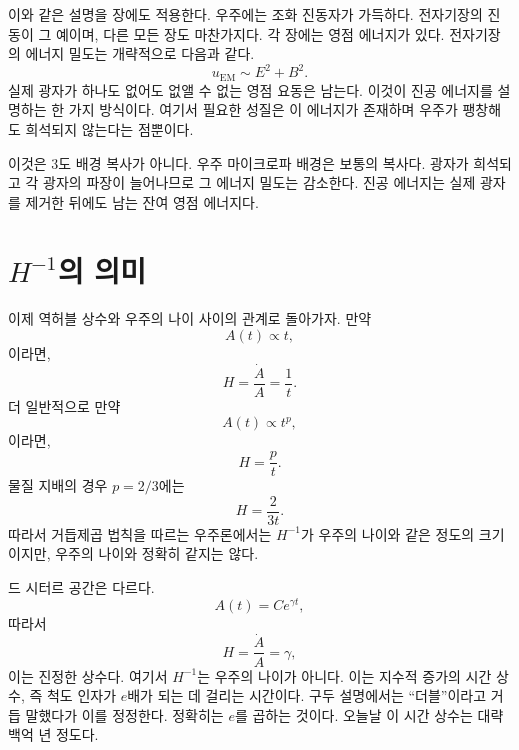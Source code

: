 이와 같은 설명을 장에도 적용한다. 우주에는 조화 진동자가 가득하다. 전자기장의 진동이 그 예이며, 다른 모든 장도 마찬가지다. 각 장에는 영점 에너지가 있다. 전자기장의 에너지 밀도는 개략적으로 다음과 같다.
\begin{equation}
u_{\mathrm{EM}}\sim E^2+B^2.
\end{equation}
실제 광자가 하나도 없어도 없앨 수 없는 영점 요동은 남는다. 이것이 진공 에너지를 설명하는 한 가지 방식이다. 여기서 필요한 성질은 이 에너지가 존재하며 우주가 팽창해도 희석되지 않는다는 점뿐이다.

\begin{classroomqa}
\end{classroomqa}

이것은 3도 배경 복사가 아니다. 우주 마이크로파 배경은 보통의 복사다. 광자가 희석되고 각 광자의 파장이 늘어나므로 그 에너지 밀도는 감소한다. 진공 에너지는 실제 광자를 제거한 뒤에도 남는 잔여 영점 에너지다.

\section{\(H^{-1}\)의 의미}

이제 역허블 상수와 우주의 나이 사이의 관계로 돌아가자. 만약
\begin{equation}
A(t)\propto t,
\end{equation}
이라면,
\begin{equation}
H=\frac{\dot A}{A}=\frac{1}{t}.
\end{equation}
더 일반적으로 만약
\begin{equation}
A(t)\propto t^p,
\end{equation}
이라면,
\begin{equation}
H=\frac{p}{t}.
\end{equation}
물질 지배의 경우 \(p=2/3\)에는
\begin{equation}
H=\frac{2}{3t}.
\end{equation}
따라서 거듭제곱 법칙을 따르는 우주론에서는 \(H^{-1}\)가 우주의 나이와 같은 정도의 크기이지만, 우주의 나이와 정확히 같지는 않다.

드 시터르 공간은 다르다. \begin{equation}
A(t)=C e^{\gamma t},
\end{equation}따라서 \begin{equation}
H=\frac{\dot A}{A}=\gamma,
\end{equation}이는 진정한 상수다. 여기서 \(H^{-1}\)는 우주의 나이가 아니다. 이는 지수적 증가의 시간 상수, 즉 척도 인자가 \(e\)배가 되는 데 걸리는 시간이다. 구두 설명에서는 ``더블''이라고 거듭 말했다가 이를 정정한다. 정확히는 \(e\)를 곱하는 것이다. 오늘날 이 시간 상수는 대략 백억 년 정도다.

